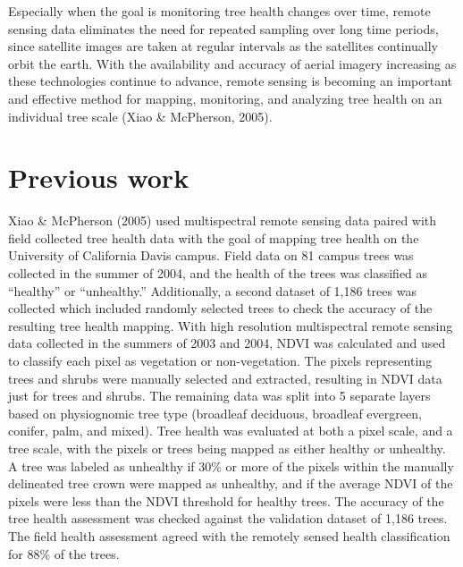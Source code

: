 \documentclass[12pt,twoside]{reedthesis}
\begin{document}
Especially when the goal is monitoring tree health changes over time,
remote sensing data eliminates the need for repeated sampling over long
time periods, since satellite images are taken at regular intervals as
the satellites continually orbit the earth. With the availability and
accuracy of aerial imagery increasing as these technologies continue to
advance, remote sensing is becoming an important and effective method
for mapping, monitoring, and analyzing tree health on an individual tree
scale (Xiao \& McPherson, 2005).

\hypertarget{previous-work}{%
\section{Previous work}\label{previous-work}}

Xiao \& McPherson (2005) used multispectral remote sensing data paired with field
collected tree health data with the goal of mapping tree health on the
University of California Davis campus. Field data on 81 campus trees was
collected in the summer of 2004, and the health of the trees was
classified as ``healthy'' or ``unhealthy.'' Additionally, a second dataset
of 1,186 trees was collected which included randomly selected trees to
check the accuracy of the resulting tree health mapping. With high
resolution multispectral remote sensing data collected in the summers of
2003 and 2004, NDVI was calculated and used to classify each pixel as
vegetation or non-vegetation. The pixels representing trees and shrubs
were manually selected and extracted, resulting in NDVI data just for
trees and shrubs. The remaining data was split into 5 separate layers
based on physiognomic tree type (broadleaf deciduous, broadleaf
evergreen, conifer, palm, and mixed). Tree health was evaluated at both
a pixel scale, and a tree scale, with the pixels or trees being mapped
as either healthy or unhealthy. A tree was labeled as unhealthy if 30\%
or more of the pixels within the manually delineated tree crown were
mapped as unhealthy, and if the average NDVI of the pixels were less
than the NDVI threshold for healthy trees. The accuracy of the tree
health assessment was checked against the validation dataset of 1,186
trees. The field health assessment agreed with the remotely sensed
health classification for 88\% of the trees.
\end{document}
